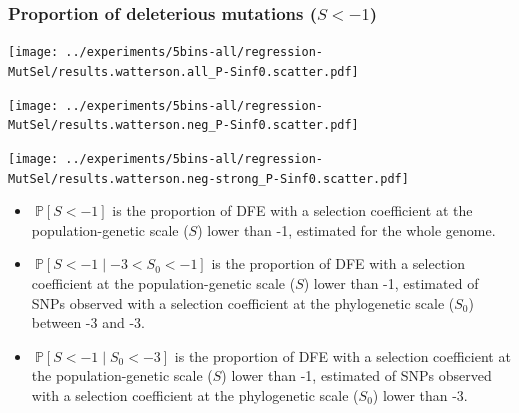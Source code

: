 \documentclass{article}
\newcommand{\proba}{\mathbb{P}}
\newcommand{\Sphy}{S_{0}}
\newcommand{\divStrongDel}{\Sphy < -3}
\newcommand{\divDel}{-3 < \Sphy < -1}
\newcommand{\given}{\mid}
\newcommand{\Spop}{S}
\newcommand{\polyDel}{\Spop < -1}
\begin{document}
    \subsubsection{Proportion of deleterious mutations ($\polyDel$)}\label{subsec:proportion-deleterious-mutations}
    \begin{minipage}{0.32\linewidth}
        \texttt{[image: ../experiments/5bins-all/regression-MutSel/results.watterson.all\_P-Sinf0.scatter.pdf]}
    \end{minipage}
    \begin{minipage}{0.32\linewidth}
        \texttt{[image: ../experiments/5bins-all/regression-MutSel/results.watterson.neg\_P-Sinf0.scatter.pdf]}
    \end{minipage}
    \begin{minipage}{0.32\linewidth}
        \texttt{[image: ../experiments/5bins-all/regression-MutSel/results.watterson.neg-strong\_P-Sinf0.scatter.pdf]}
    \end{minipage}
    \begin{itemize}
        \item $\ \proba [ \polyDel ]$ is the proportion of DFE with a selection coefficient at the population-genetic scale ($\Spop$) lower than -1, estimated for the whole genome.
        \item $\ \proba [ \polyDel \given \divDel]$ is the proportion of DFE with a selection coefficient at the population-genetic scale ($\Spop$) lower than -1, estimated of SNPs observed with a selection coefficient at the phylogenetic scale ($\Sphy$) between -3 and -3.
        \item $\ \proba [ \polyDel \given \divStrongDel ]$ is the proportion of DFE with a selection coefficient at the population-genetic scale ($\Spop$) lower than -1, estimated of SNPs observed with a selection coefficient at the phylogenetic scale ($\Sphy$) lower than -3.
    \end{itemize}
\end{document}
